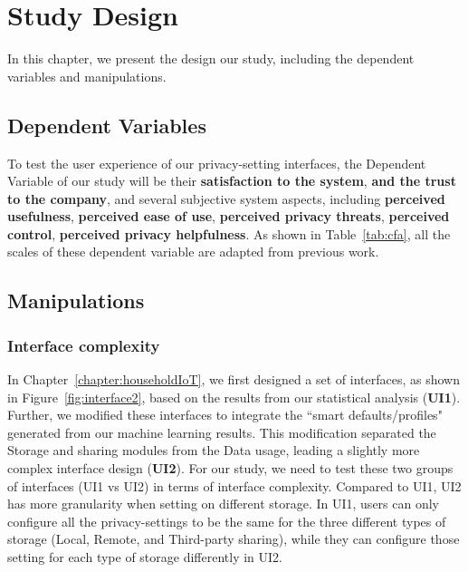 \section{Study Design}
In this chapter, we present the design our study, including the dependent variables and manipulations.
\subsection{Dependent Variables}
To test the user experience of our privacy-setting interfaces, the Dependent Variable of our study will be their \textbf{satisfaction to the system}, \textbf{and the trust to the company}, and several subjective system aspects, including \textbf{perceived usefulness}, \textbf{perceived ease of use}, \textbf{perceived privacy threats}, \textbf{perceived control}, \textbf{perceived privacy helpfulness}. As shown in Table~\ref{tab:cfa}, all the scales of these dependent variable are adapted from previous work.

\subsection{Manipulations}

\subsubsection{Interface complexity}
In Chapter~\ref{chapter:householdIoT},  we first designed a set of interfaces, as shown in Figure~\ref{fig:interface2}, based on the results from our statistical analysis (\textbf{UI1}). Further, we modified these interfaces to integrate the ``smart defaults/profiles" generated from our machine learning results. This modification separated the Storage and sharing modules from the Data usage, leading a slightly more complex interface design (\textbf{UI2}). For our study, we need to test these two groups of interfaces (UI1 vs UI2) in terms of interface complexity. Compared to UI1, UI2 has more granularity when setting on different storage. In UI1, users can only configure all the privacy-settings to be the same for the three different types of storage (Local, Remote, and Third-party sharing), while they can configure those setting for each type of storage differently in UI2.

